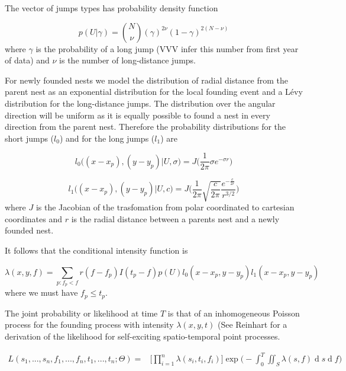 \documentclass{article}
\renewcommand{\d}[1]{\ensuremath{\operatorname{d}\!{#1}}}
\begin{document}
The vector of jumps types has probability density function

\begin{equation*}
    p(U| \gamma ) = {N \choose \nu}(\gamma)^{2\nu}(1 - \gamma)^{2(N - \nu)}
\end{equation*}
where $\gamma$ is the probability of a long jump (VVV infer this number from first year of data) and $\nu$ is the number of long-distance jumps.

For newly founded nests we model the distribution of radial distance from the parent nest as an exponential distribution for the local founding event and a L\'evy distribution for the long-distance jumps. The distribution over the angular direction will be uniform as it is equally possible to found a nest in every direction from the parent nest. Therefore the probability distributions for the short jumps ($l_0$) and for the long jumps ($l_1$) are

\begin{equation*}
    l_0\Big((x - x_p), (y - y_p) | U, \sigma \Big)= J \bigg(\frac{1}{2 \pi} \sigma e^{- \sigma r}\bigg)
\end{equation*}

\begin{equation*}
    l_1\Big((x - x_p), (y - y_p) | U, c \Big)= J \bigg(\frac{1}{2 \pi} \sqrt{\frac{c}{2 \pi}} \frac{e^{- \frac{c}{ 2 r}}}{r^{3/2}}\bigg)
\end{equation*}
where $J$ is the Jacobian of the trasfomation from polar coordinated to cartesian coordinates and $r$ is the radial distance between a parents nest and a newly founded nest.

It follows that the conditional intensity function is

\begin{equation*}
    \lambda(x, y, f) = \sum_{p:f_p < f} r(f - f_p) I(t_p - f) p(U) l_0(x - x_p, y - y_p) l_1(x - x_p, y - y_p)
\end{equation*}
where we must have $f_p\leq t_p$.

The joint probability or likelihood at time $T$ is that of an inhomogeneous Poisson process for the founding process with intensity $\lambda(x, y, t)$ (See Reinhart \cite{Reinhart} for a derivation of the likelihood for self-exciting spatio-temporal point processes.

\begin{equation*} \label{eq:like}
    \begin{aligned}
        L(s_{1}, ..., s_{n}, f_{1}, ..., f_{n}, t_{1}, ..., t_{n} ; \Theta) = & \Bigg[ \prod_{i = 1}^{n} \lambda(s_{i}, t_{i}, f_{i}) \Bigg] \exp \Bigg(- \int_{0}^{T} \iint_{S} \lambda(s, f) \d s \d f \Bigg) \\
    \end{aligned}
\end{equation*}
\end{document}
